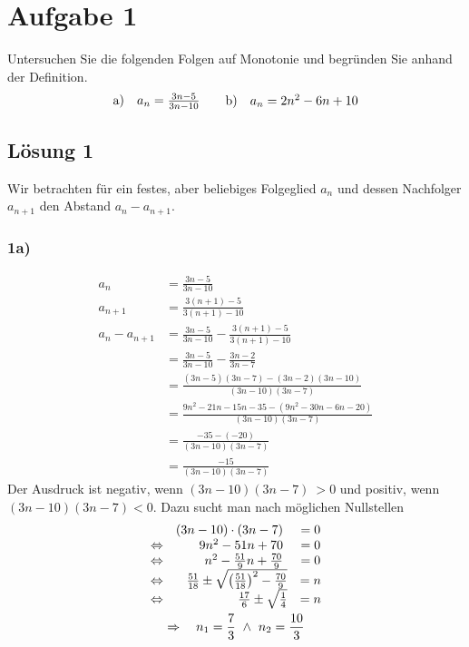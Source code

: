 \section*{Aufgabe 1}

Untersuchen Sie die folgenden Folgen auf Monotonie und begründen Sie anhand der Definition.
\begin{align*}
  \begin{array}{ c c }
    \text{a)} & a_{n} =\frac{3n-5}{3n-10}
  \end{array} & & \begin{array}{ c c }
    \text{b)} & a_{n} =2n^{2} -6n+10
  \end{array}
\end{align*}


\subsection*{Lösung 1}
Wir betrachten für ein festes, aber beliebiges Folgeglied $\displaystyle a_{n}$ und dessen Nachfolger $\displaystyle a_{n+1}$ den Abstand $\displaystyle a_{n} -a_{n+1}$.

\subsubsection*{1a)}

\begin{align*}
  a_{n} & =\frac{3n-5}{3n-10}\\
  a_{n+1} & =\frac{3( n+1) -5}{3( n+1) -10}\\
  a_{n} -a_{n+1} & =\frac{3n-5}{3n-10} -\frac{3( n+1) -5}{3( n+1) -10}\\
  & =\frac{3n-5}{3n-10} -\frac{3n-2}{3n-7}\\
  & =\frac{( 3n-5)( 3n-7) -( 3n-2)( 3n-10)}{( 3n-10)( 3n-7)}\\
  & =\frac{9n^{2} -21n-15n-35-\left( 9n^{2} -30n-6n-20\right)}{( 3n-10)( 3n-7)}\\
  & =\frac{-35-( -20)}{( 3n-10)( 3n-7)}\\
  & =\frac{-15}{( 3n-10)( 3n-7)}
\end{align*}
Der Ausdruck ist negativ, wenn $\displaystyle ( 3n-10)( 3n-7) \  >0$ und positiv, wenn $\displaystyle ( 3n-10)( 3n-7) < 0$. Dazu sucht man nach möglichen Nullstellen
\begin{gather*}
  \begin{array}{ c r c }
    & ( 3n-10) \cdot ( 3n-7) \  & =0\\
    \Leftrightarrow  & 9n^{2} -51n+70\  & =0\\
    \Leftrightarrow  & n^{2} -\frac{51}{9} n+\frac{70}{9} \  & =0\\
    \Leftrightarrow  & \frac{51}{18} \pm \sqrt{\left(\frac{51}{18}\right)^{2} -\frac{70}{9}} & =n\\
    \Leftrightarrow  & \frac{17}{6} \pm \sqrt{\frac{1}{4}} & =n
  \end{array}\\
  \Rightarrow \ \ \ n_{1} =\frac{7}{3} \ \land \ n_{2} =\frac{10}{3}
\end{gather*}


